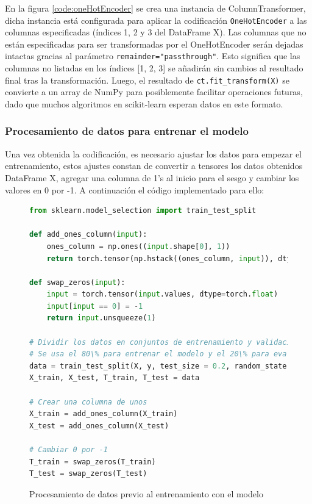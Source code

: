 \documentclass{article}
\begin{document}
En la figura \ref{code:oneHotEncoder} se crea una instancia de ColumnTransformer, dicha instancia está configurada para aplicar la codificación \texttt{OneHotEncoder} a las columnas especificadas (índices 1, 2 y 3 del DataFrame X). Las columnas que no están especificadas para ser transformadas por el OneHotEncoder serán dejadas intactas gracias al parámetro \texttt{remainder="passthrough"}. Esto significa que las columnas no listadas en los índices [1, 2, 3] se añadirán sin cambios al resultado final tras la transformación. Luego, el resultado de \texttt{ct.fit\_transform(X)} se convierte a un array de NumPy para posiblemente facilitar operaciones futuras, dado que muchos algoritmos en scikit-learn esperan datos en este formato.

\subsubsection{Procesamiento de datos para entrenar el modelo}

Una vez obtenida la codificación, es necesario ajustar los datos para empezar el entrenamiento, estos ajustes constan de convertir a tensores los datos obtenidos DataFrame X, agregar una columna de 1's al inicio para el sesgo y cambiar los valores en 0 por -1. A continuación el código implementado para ello:

\begin{figure}[htbp]
\begin{lstlisting}[language=Python, texcl=True]
from sklearn.model_selection import train_test_split

def add_ones_column(input):
    ones_column = np.ones((input.shape[0], 1))
    return torch.tensor(np.hstack((ones_column, input)), dtype=torch.float)

def swap_zeros(input):
    input = torch.tensor(input.values, dtype=torch.float)
    input[input == 0] = -1
    return input.unsqueeze(1)

# Dividir los datos en conjuntos de entrenamiento y validación
# Se usa el 80\% para entrenar el modelo y el 20\% para evaluarlo el modelo
data = train_test_split(X, y, test_size = 0.2, random_state = 0, stratify=y)
X_train, X_test, T_train, T_test = data

# Crear una columna de unos
X_train = add_ones_column(X_train)
X_test = add_ones_column(X_test)

# Cambiar 0 por -1
T_train = swap_zeros(T_train)
T_test = swap_zeros(T_test)
\end{lstlisting}
\caption{Procesamiento de datos previo al entrenamiento con el modelo}
\label{code:cleaning_data}
\end{figure}
\end{document}
